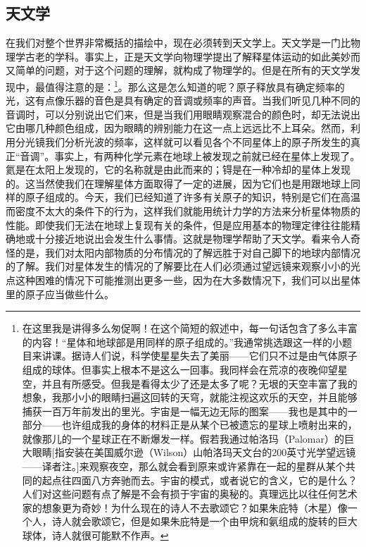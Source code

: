 \documentclass[11pt,oneside]{book}
\begin{document}
\begin{common-format}
\section{天文学}
在我们对整个世界非常概括的描绘中，现在必须转到天文学上。天文学是一门比物理学古老的学科。事实上，正是天文学向物理学提出了解释星体运动的如此美妙而又简单的问题，对于这个问题的理解，就构成了物理学的。但是在所有的天文学发现中，最值得注意的是：\footnote{在这里我是讲得多么匆促啊！在这个简短的叙述中，每一句话包含了多么丰富的内容！“星体和地球部是用同样的原子组成的。”我通常挑选跟这一样的小题目来讲课。据诗人们说，科学使星星失去了美丽——它们只不过是由气体原子组成的球体。但事实上根本不是这么一回事。我同样会在荒凉的夜晚仰望星空，并且有所感受。但我是看得太少了还是太多了呢？无垠的天空丰富了我的想象，我那小小的眼睛扫遍这回转的天穹，就能注视这欢乐的天空，并且能够捕获一百万年前发出的里光。宇宙是一幅无边无际的图案——我也是其中的一部分——也许组成我的身体的材料正是从某个已被遗忘的星球上喷射出来的，就像那儿的一个星球正在不断爆发一样。假若我通过帕洛玛（Palomar）的巨大眼睛[指安装在美国威尔逊（Wilson）山帕洛玛天文台的200英寸光学望远镜——译者注。]来观察夜空，那么就会看到原来或许紧靠在一起的星群从某个共同的起点往四面八方奔驰而去。宇宙的模式，或者说它的含义，它的是什么？人们对这些问题有点了解是不会有损于宇宙的奥秘的。真理远比以往任何艺术家的想象更为奇妙！为什么现在的诗人不去歌颂它？如果朱庇特（木星）像一个人，诗人就会歌颂它，但是如果朱庇特是一个由甲烷和氨组成的旋转的巨大球体，诗人就很可能默不作声。}。那么这是怎么知道的呢？原子释放具有确定频率的光，这有点像乐器的音色是具有确定的音调或频率的声音。当我们听见几种不同的音调时，可以分别说出它们来，但是当我们用眼睛观察混合的颜色时，却无法说出它由哪几种颜色组成，因为眼睛的辨别能力在这一点上远远比不上耳朵。然而，利用分光镜我们分析光波的频率，这样就可以看见各个不同星体上的原子所发生的真正“音调”。事实上，有两种化学元素在地球上被发现之前就已经在星体上发现了。氦是在太阳上发现的，它的名称就是由此而来的；锝是在一种冷却的星体上发现的。这当然使我们在理解星体方面取得了一定的进展，因为它们也是用跟地球上同样的原子组成的。今天，我们已经知道了许多有关原子的知识，特别是它们在高温而密度不太大的条件下的行为，这样我们就能用统计力学的方法来分析星体物质的性能。即使我们无法在地球上复现有关的条件，但是应用基本的物理定律往往能精确地或十分接近地说出会发生什么事情。这就是物理学帮助了天文学。看来令人奇怪的是，我们对太阳内部物质的分布情况的了解远胜于对自己脚下的地球内部情况的了解。我们对星体发生的情况的了解要比在人们必须通过望远镜来观察小小的光点这种困难的情况下可能推测出更多一些，因为在大多数情况下，我们可以出星体里的原子应当做些什么。


\end{common-format}
\end{document}
